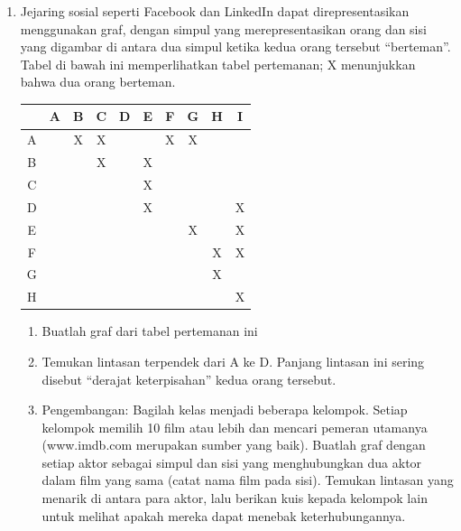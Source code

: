 \begin{enumerate}[start=18]
\item Jejaring sosial seperti Facebook dan LinkedIn dapat direpresentasikan menggunakan graf, dengan simpul yang merepresentasikan orang dan sisi yang digambar di antara dua simpul ketika kedua orang tersebut “berteman”.   Tabel di bawah ini memperlihatkan tabel pertemanan; X menunjukkan bahwa dua orang berteman.
\begin{center}
\begin{tabular}{|c|c|c|c|c|c|c|c|c|c|}
\hline
&A&B&C&D&E&F&G&H&I\\
\hline
A & \cellcolor{yellow}&X&X&&&X&X&&\\
\hline
B& \cellcolor{yellow}& \cellcolor{yellow}&X&&X&&&&\\
\hline
C& \cellcolor{yellow}& \cellcolor{yellow}& \cellcolor{yellow}&&X&&&&\\
\hline
D& \cellcolor{yellow}& \cellcolor{yellow}& \cellcolor{yellow}& \cellcolor{yellow}&X&&&&X\\
\hline
E& \cellcolor{yellow}& \cellcolor{yellow}& \cellcolor{yellow}& \cellcolor{yellow}& \cellcolor{yellow}&&X&&X\\
\hline
F& \cellcolor{yellow}& \cellcolor{yellow}& \cellcolor{yellow}& \cellcolor{yellow}& \cellcolor{yellow}& \cellcolor{yellow}&&X&X\\
\hline
G& \cellcolor{yellow}& \cellcolor{yellow}& \cellcolor{yellow}& \cellcolor{yellow}& \cellcolor{yellow}& \cellcolor{yellow}& \cellcolor{yellow}&X&\\
\hline
H& \cellcolor{yellow}& \cellcolor{yellow}& \cellcolor{yellow}& \cellcolor{yellow}& \cellcolor{yellow}& \cellcolor{yellow}& \cellcolor{yellow}& \cellcolor{yellow}&X\\
\hline
\end{tabular}
\par{}\label{tab:graphtheory-dor1-tab04}%

\end{center}
\begin{enumerate}
\item	Buatlah graf dari tabel pertemanan ini
\item	Temukan lintasan terpendek dari A ke D.  Panjang lintasan ini sering disebut “derajat keterpisahan” kedua orang tersebut.
\item	Pengembangan:  Bagilah kelas menjadi beberapa kelompok.  Setiap kelompok memilih 10 film atau lebih dan mencari pemeran utamanya (www.imdb.com merupakan sumber yang baik).  Buatlah graf dengan setiap aktor sebagai simpul dan sisi yang menghubungkan dua aktor dalam film yang sama (catat nama film pada sisi).  Temukan lintasan yang menarik di antara para aktor, lalu berikan kuis kepada kelompok lain untuk melihat apakah mereka dapat menebak keterhubungannya.\\
\end{enumerate}


\end{enumerate}
